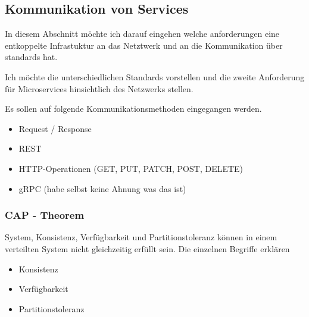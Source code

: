 \subsection{Kommunikation von Services}
\label{sec:kommunikation}

In diesem Abschnitt möchte ich darauf eingehen welche anforderungen eine entkoppelte Infrastuktur an das Netztwerk und an die Kommunikation über standards hat.

Ich möchte die unterschiedlichen Standards vorstellen und die zweite Anforderung für Microservices hinsichtlich des Netzwerks stellen.

Es sollen auf folgende Kommunikationsmethoden eingegangen werden.
\begin{itemize}
	\item Request / Response
	\item REST
	\item HTTP-Operationen (GET, PUT, PATCH, POST, DELETE)
	\item gRPC (habe selbst keine Ahnung was das ist)
\end{itemize}

\subsubsection{CAP - Theorem}
\label{sec:cap}

System, Konsistenz, Verfügbarkeit und Partitionstoleranz können in einem verteilten System nicht gleichzeitig erfüllt sein.
Die einzelnen Begriffe erklären \begin{itemize}
	\item Konsistenz
	\item Verfügbarkeit
	\item Partitionstoleranz
\end{itemize}
